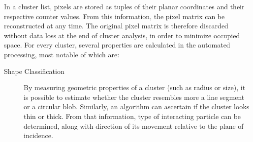 In a cluster list, pixels are stored as tuples of their planar coordinates and their respective counter values. From this information, the pixel matrix can be reconstructed at any time. The original pixel matrix is therefore discarded without data loss at the end of cluster analysis, in order to minimize occupied space. For every cluster, several properties are calculated in the automated processing, most notable of which are:

\label{db:cluster-properties}
\begin{description}
	\item[Shape Classification]
	\label{db:shape-classification}
	By measuring geometric properties of a cluster (such as radius or size), it is possible to estimate whether the cluster resembles more a line segment or a circular blob. Similarly, an algorithm can ascertain if the cluster looks thin or thick. From that information, type of interacting particle can be determined, along with direction of its movement relative to the plane of incidence. 

	\todo


    \begin{figure}[t]
    \begin{center}

\end{center}
\end{figure}
\end{description}
